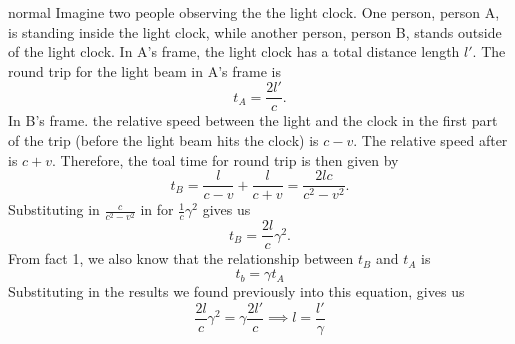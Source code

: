 \begin{solution}{normal}
Imagine two people observing the the light clock. One person, person A, is standing inside the light clock, while another person, person B, stands outside of the light clock. In A's frame, the light clock has a total distance length $l'$. The round trip for the light beam in A's frame is 
\[t_A = \frac{2l'}{c}.\]
In B's frame. the relative speed between the light and the clock in the first part of the trip (before the light beam hits the clock) is $c-v$. The relative speed after is $c+v$. Therefore, the toal time for round trip is then given by 
\[t_B = \frac{l}{c-v} + \frac{l}{c+v} = \frac{2lc}{c^2-v^2}.\]
Substituting in $\frac{c}{c^2-v^2}$ in for $\frac{1}{c}\gamma^2$ gives us 
\[t_B = \frac{2l}{c}\gamma^2.\]
From fact 1, we also know that the relationship between $t_B$ and $t_A$ is 
\[t_b = \gamma t_A\]
Substituting in the results we found previously into this equation, gives us 
\[\frac{2l}{c}\gamma^2 = \gamma\frac{2l'}{c}\implies \boxed{l = \frac{l'}{\gamma}}\]
\end{solution}
